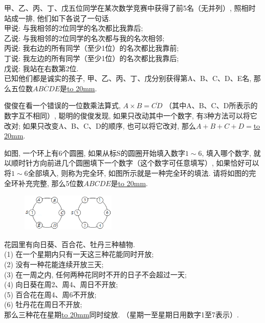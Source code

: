 \item {
    甲、乙、丙、丁、戊五位同学在某次数学竞赛中获得了前5名（无并列）, 照相时站成一排, 他们如下各说了一句话. \\
    甲说: 与我相邻的2位同学的名次都比我靠后; \\
    乙说: 与我相邻的2位同学的名次都与我的名次相邻; \\
    丙说: 我右边的所有同学（至少1位）的名次都比我靠前; \\
    丁说: 我左边的所有同学（至少1位）的名次都比我靠后; \\
    戊说: 我站在右数第2位. \\
    已知他们都是诚实的孩子, 甲、乙、丙、丁、戊分别获得第A、B、C、D、E名, 那么五位数$\overline{ABCDE}$是\underline{\hbox to 20mm{}}.
    \vspace{1cm}
}

\item {
    俊俊在看一个错误的一位数乘法算式, $A\times B=\overline{CD}$ （其中A、B、C、D所表示的数字互不相同）, 聪明的俊俊发现, 如果只改动其中一个数字, 有3种方法可以将它改对; 如果只改变A、B、C、D的顺序, 也可以将它改对, 那么$A+B+C+D=$\underline{\hbox to 20mm{}}.
    \vspace{1cm}
}

\item {
    如图, 一个环上有6个圆圈, 如果从标S的圆圈开始填入数字$1\sim 6$, 填入哪个数字, 就以顺时针方向前进几个圆圈填下一个数字（这个数字可任意填写）, 如果恰好可以将$1\sim 6$全部填入, 则称为完全环, 如图所示就是一种完全环的填法. 请将如图的完全环补充完整, 那么5位数$ABCDE$是\underline{\hbox to 20mm{}}.
    \begin{figure}[H]
        \centering
        \includegraphics[width=0.4\textwidth]{./pics/Chapter_5/2016_3.png}
    \end{figure}
    \vspace{1cm}
}

\item {
    花园里有向日葵、百合花、牡丹三种植物. \\
    (1) 在一个星期内只有一天这三种花能同时开放; \\
    (2) 没有一种花能连续开放三天; \\
    (3) 在一周之内, 任何两种花同时不开的日子不会超过一天; \\
    (4) 向日葵在周2、周4、周日不开放; \\
    (5) 百合花在周4、周6不开放; \\
    (6) 牡丹花在周日不开放; \\
    那么三种花在星期\underline{\hbox to 20mm{}}同时绽放. （星期一至星期日用数字1至7表示）. 
    \vspace{1cm}
}